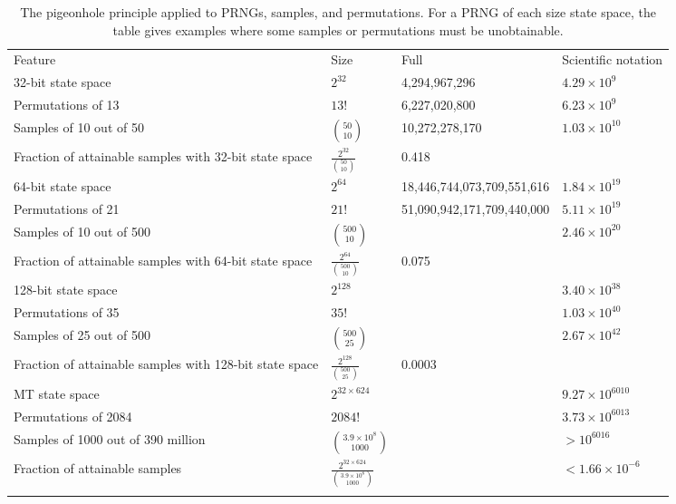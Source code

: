 \documentclass[graybox]{svmult}
\begin{document}
\begin{table}
\caption{The pigeonhole principle applied to PRNGs, samples, and permutations.
For a PRNG of each size state space, the table gives examples where some samples or permutations 
must be unobtainable.}
\label{tab:pigeonhole}       
\begin{tabular}[h]{p{4cm}p{2.4cm}p{4cm}p{2cm}}
\hline\noalign{\smallskip}
Feature & Size & Full & Scientific notation  \\
\noalign{\smallskip}\svhline\noalign{\smallskip}
32-bit state space & $2^{32}$ & 4,294,967,296 & $4.29 \times 10^9$ \\
Permutations of 13 & $13!$ & 6,227,020,800 & $6.23 \times 10^9$ \\
Samples of 10 out of 50 & ${50 \choose 10}$ &  10,272,278,170 & $1.03\times 10^{10} $ \\
Fraction of attainable samples with 32-bit state space & $\frac{2^{32}}{{50 \choose 10}}$   & 0.418 & \\
\noalign{\smallskip}\svhline\noalign{\smallskip}
64-bit state space & $2^{64}$ & 18,446,744,073,709,551,616 & $1.84 \times 10^{19}$ \\
Permutations of 21 & $21!$ &  51,090,942,171,709,440,000 & $5.11 \times 10^{19}$ \\
Samples of 10 out of 500 & ${500 \choose 10}$ & & $2.46 \times 10^{20}$ \\
Fraction of attainable samples with 64-bit state space & $\frac{2^{64}}{{500 \choose 10}}$ &  0.075 & \\
\noalign{\smallskip}\svhline\noalign{\smallskip}
128-bit state space & $2^{128}$ &  & $3.40 \times 10^{38}$ \\
Permutations of 35 & $35!$ &   & $1.03 \times 10^{40}$ \\
Samples of 25 out of 500 & ${500 \choose 25}$ & & $2.67 \times 10^{42}$ \\
Fraction of attainable samples with 128-bit state space & $\frac{2^{128}}{{500 \choose 25}}$ &  0.0003 & \\
\noalign{\smallskip}\svhline\noalign{\smallskip}
MT state space & $2^{32 \times 624}$ & & $9.27\times 10^{6010}$ \\
Permutations of 2084 & $2084!$ &   & $3.73 \times 10^{6013}$ \\
Samples of 1000 out of 390 million & ${3.9\times 10^8 \choose 1000}$ & & $> 10^{6016}$ \\
Fraction of attainable samples & $\frac{2^{32 \times 624}}{{3.9\times 10^8 \choose 1000}}$ &  & $< 1.66 \times 10^{-6}$ \\
\noalign{\smallskip}\svhline\noalign{\smallskip}
\end{tabular}
\end{table}
\end{document}

